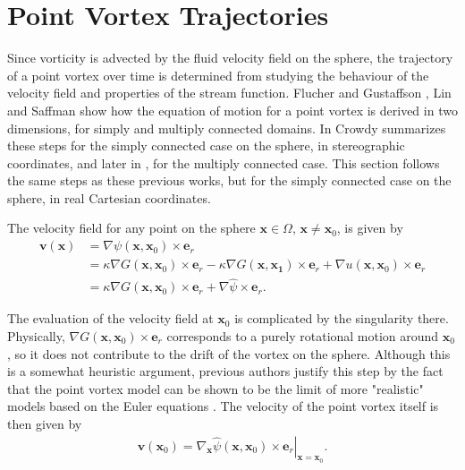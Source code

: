 \documentclass{sfuthesis}
\begin{document}
\section{Point Vortex Trajectories}
\label{sec: PVTraj}
Since vorticity is advected by the fluid velocity field on the sphere, the trajectory of a point vortex over time is determined from studying the behaviour of the velocity field and properties of the stream function. Flucher and Gustaffson \cite{FluchGust97}, Lin \cite{Lin41} and Saffman \cite{Saff92} show how the equation of motion for a point vortex is derived in two dimensions, for simply and multiply connected domains. In \cite{Crowdy2006} Crowdy summarizes these steps for the simply connected case on the sphere, in stereographic coordinates, and later in \cite{SurCrow2008}, for the multiply connected case. This section follows the same steps as these previous works, but for the simply connected case on the sphere, in real Cartesian coordinates. 

The velocity field for any point on the sphere $\mathbf{x}\in \Omega$, $\mathbf{x}\neq \mathbf{x}_0$, is given by 
\begin{align*}
	\mathbf{v}(\mathbf{x})&=\nabla \psi(\mathbf{x},\mathbf{x}_0) \times {\mathbf{e}}_r\\
                                          &=\kappa \nabla G(\mathbf{x},\mathbf{x}_0) \times {\mathbf{e}}_r -\kappa \nabla G(\mathbf{x},\mathbf{x_1}) \times {\mathbf{e}}_r + \nabla u(\mathbf{x},\mathbf{x}_0)\times {\mathbf{e}}_r \\
                                          &=\kappa \nabla G(\mathbf{x},\mathbf{x}_0) \times {\mathbf{e}}_r + \nabla \hat{\psi} \times {\mathbf{e}}_r. 
 \end{align*}
 
\noindent The evaluation of the velocity field at $\mathbf{x}_0$ is complicated by the singularity there. Physically, $\nabla {G}(\mathbf{x},\mathbf{x}_0) \times {\mathbf{e}}_r$ corresponds to a purely rotational motion around $\mathbf{x}_0$, so it does not contribute to the drift of the vortex on the sphere. Although this is a somewhat heuristic argument, previous authors \cite{FluchGust97, YinZhan97} justify this step by the fact that the point vortex model can be shown to be the limit of more "realistic" models based on the Euler equations \cite{March88,Turk87}. 
The velocity of the point vortex itself is then given by 
\begin{align*}
	\mathbf{v}(\mathbf{x}_0)=\left.\nabla_{\mathbf{x}} \hat{\psi}(\mathbf{x},\mathbf{x}_0) \times {\mathbf{e}}_r \right|_{\mathbf{x}=\mathbf{x}_0}.
\end{align*}
\end{document}

